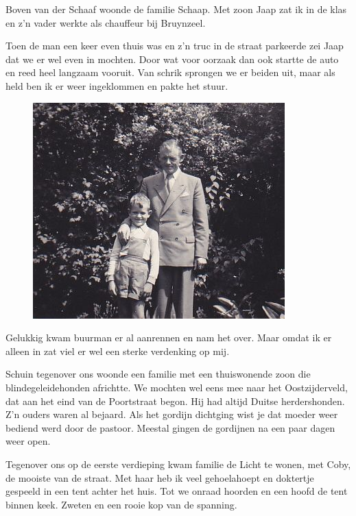 \documentclass[12pt,twoside]{memoir}
\begin{document}
Boven van der Schaaf woonde de familie Schaap. Met zoon Jaap zat ik in de klas en z’n vader werkte als chauffeur bij Bruynzeel. 

Toen de man een keer even thuis was en z'n truc in de straat parkeerde zei Jaap dat we er wel even in mochten. Door wat voor oorzaak dan ook startte de auto en reed heel langzaam vooruit. Van schrik sprongen we er beiden uit, maar als held ben ik er weer ingeklommen en pakte het stuur. 

\begin{figure}
\includegraphics[width=\textwidth]{img/ch5/indetuin}
\caption*{\footnotesize }
\end{figure}

Gelukkig kwam buurman er al aanrennen en nam het over. Maar omdat ik er alleen in zat viel er wel een sterke verdenking op mij. 

Schuin tegenover ons woonde een familie met een thuiswonende zoon die blindegeleidehonden africhtte. We mochten wel eens mee naar het Oostzijderveld, dat aan het eind van de Poortstraat begon. Hij had altijd Duitse herdershonden. Z'n ouders waren al bejaard. Als het gordijn dichtging wist je dat moeder weer bediend werd door de pastoor. Meestal gingen de gordijnen na een paar dagen weer open. 

Tegenover ons op de eerste verdieping kwam familie de Licht te wonen, met Coby, de mooiste van de straat. Met haar heb ik veel gehoelahoept en doktertje gespeeld in een tent achter het huis. Tot we onraad hoorden en een hoofd de tent binnen keek. Zweten en een rooie kop van de spanning. 
\end{document}
